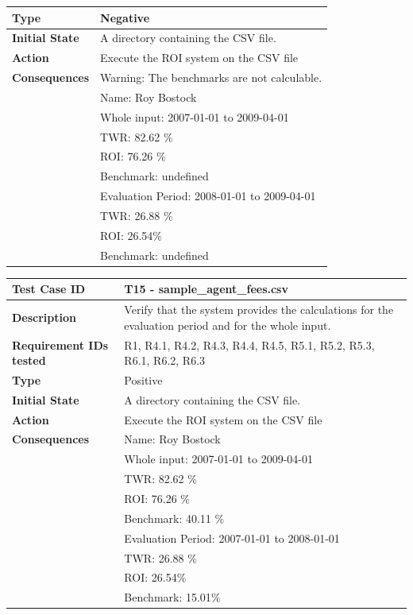 \documentclass[runningheads,12pt]{article}
\begin{document}
{\begin{tabular}{|p{1.2in}|p{4in}|}
\hline
\textbf{Type} & Negative \\ 
\hline
\textbf{Initial State} & A directory containing the CSV file.\\
\hline 
\textbf{Action} & Execute the ROI system on the CSV file \\
\hline 
\textbf{Consequences} & Warning: The benchmarks are not calculable.\\
& Name: Roy Bostock\\
& Whole input: 2007-01-01 to 2009-04-01\\
& TWR:  82.62 $\%$\\
& ROI: 76.26 $\%$\\
& Benchmark: undefined \\ 
& Evaluation Period: 2008-01-01 to 2009-04-01\\
& TWR: 26.88 $\%$\\
& ROI: 26.54$\%$\\
& Benchmark: undefined \\ 
\hline
\end{tabular}
\bigskip
\centering
\begin{tabular}{|p{1.2in}|p{4in}|}
\hline
\textbf{Test Case ID} & T15 - sample\_agent\_fees.csv \\ 
\hline
\textbf{Description} & Verify that the system provides the calculations for the evaluation period and for the whole input.\\
\hline
\textbf{Requirement IDs tested} & R1, R4.1, R4.2, R4.3, R4.4, R4.5, R5.1, R5.2, R5.3, R6.1, R6.2, R6.3 \\ 
\hline
\textbf{Type} & Positive \\ 
\hline
\textbf{Initial State} & A directory containing the CSV file.\\
\hline 
\textbf{Action} & Execute the ROI system on the CSV file \\
\hline 
\textbf{Consequences} & Name: Roy Bostock\\
& Whole input: 2007-01-01 to 2009-04-01\\
& TWR:  82.62 $\%$\\
& ROI: 76.26 $\%$\\
& Benchmark: 40.11 $\%$ \\ 
& Evaluation Period: 2007-01-01 to 2008-01-01\\
& TWR: 26.88 $\%$\\
& ROI: 26.54$\%$\\
& Benchmark: 15.01$\%$ \\ 
\hline
\end{tabular}
}
\end{document}
